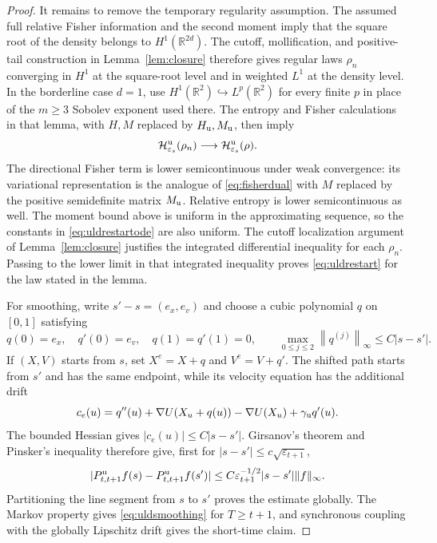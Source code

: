 \documentclass[11pt]{article}
\theoremstyle{definition}
\newcommand{\R}{\mathbb R}
\newcommand{\cH}{\mathcal H}
\newcommand{\eps}{\varepsilon}
\begin{document}
\begin{proof}
It remains to remove the temporary regularity assumption. The assumed full
relative Fisher information and the second moment imply that the square root
of the density belongs to $H^1(\R^{2d})$. The cutoff, mollification, and
positive-tail construction in Lemma~\ref{lem:closure} therefore gives regular
laws $\rho_n$ converging in $H^1$ at the square-root level and in weighted
$L^1$ at the density level. In the borderline case $d=1$, use
$H^1(\R^2)\hookrightarrow L^p(\R^2)$ for every finite $p$ in place of the
$m\geq3$ Sobolev exponent used there. The entropy and Fisher calculations in
that lemma, with $H,M$ replaced by $H_{\rm u},M_{\rm u}$, then imply
\[
 \cH^{\rm u}_{\eps_s}(\rho_n)
 \longrightarrow\cH^{\rm u}_{\eps_s}(\rho).
\]
The directional Fisher term is lower semicontinuous under weak convergence:
its variational representation is the analogue of \eqref{eq:fisherdual} with
$M$ replaced by the positive semidefinite matrix $M_{\rm u}$. Relative
entropy is lower semicontinuous as well. The moment bound above is uniform in
the approximating sequence, so the constants in \eqref{eq:uldrestartode} are
also uniform. The cutoff localization argument of
Lemma~\ref{lem:closure} justifies the integrated differential inequality for
each $\rho_n$. Passing to the lower limit in that integrated inequality proves
\eqref{eq:uldrestart} for the law stated in the lemma.

For smoothing, write $s'-s=(e_x,e_v)$ and choose a cubic polynomial $q$ on
$[0,1]$ satisfying
\[
 q(0)=e_x,\quad q'(0)=e_v,\quad q(1)=q'(1)=0,
 \qquad \max_{0\leq j\leq2}\left\|q^{(j)}\right\|_\infty\leq C|s-s'|.
\]
If $(X,V)$ starts from $s$, set $X^e=X+q$ and $V^e=V+q'$. The shifted path
starts from $s'$ and has the same endpoint, while its velocity equation has
the additional drift
\[
 c_e(u)=q''(u)+\nabla U(X_u+q(u))-\nabla U(X_u)
                   +\gamma_{\rm u}q'(u).
\]
The bounded Hessian gives $|c_e(u)|\leq C|s-s'|$. Girsanov's theorem and
Pinsker's inequality therefore give, first for
$|s-s'|\leq c\sqrt{\eps_{t+1}}$,
\[
 |P^{\rm u}_{t,t+1}f(s)-P^{\rm u}_{t,t+1}f(s')|
 \leq C\eps_{t+1}^{-1/2}|s-s'|\|f\|_\infty.
\]
Partitioning the line segment from $s$ to $s'$ proves the estimate globally.
The Markov property gives \eqref{eq:uldsmoothing} for $T\geq t+1$, and
synchronous coupling with the globally Lipschitz drift gives the short-time
claim.
\end{proof}
\end{document}
